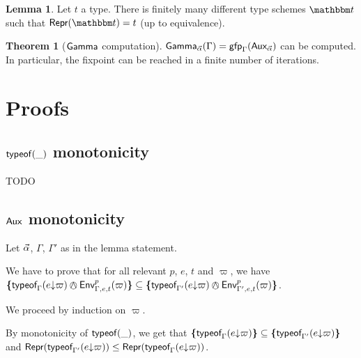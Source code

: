 \documentclass[a4paper]{article}
\theoremstyle{definition}
\newtheorem{theorem}{Theorem}
\newtheorem{lemma}{Lemma}
\begin{document}
        \begin{lemma}
          Let $t$ a type. There is finitely many different type schemes $\ts$ such that $\tsrep \ts = t$ (up to equivalence).
        \end{lemma}

        \begin{theorem}[$\textsf{Gamma}_{}$ computation]
          $\textsf{Gamma}_{\vec \alpha}(\Gamma)=\textsf{gfp}_\Gamma (\textsf{Aux}_{\vec \alpha})$ can be computed.
          In particular, the fixpoint can be reached in a finite number of iterations.
        \end{theorem}

    \section{Proofs}

    \subsection{$\textsf{typeof}_{}(\_)$ monotonicity}
    
    TODO

    \subsection{$\textsf{Aux}_{}$ monotonicity}

      Let $\vec \alpha$, $\Gamma$, $\Gamma'$ as in the lemma statement.

      We have to prove that for all relevant $p$, $e$, $t$ and $\varpi$,
      we have $\tsint {\tyof {\occ e \varpi} {\Gamma} \tsand \Gp p {\Gamma,e,t} (\varpi)} \subseteq \tsint {\tyof {\occ e \varpi} {\Gamma'} \tsand \Gp p {\Gamma',e,t} (\varpi)}$.

      We proceed by induction on $\varpi$. 

      By monotonicity of $\textsf{typeof}_{}(\_)$, we get that
      $\textbf{\textup{\{}}\textsf{typeof}_{\Gamma}(e{\downarrow}\varpi)\textbf{\textup{\}}} \subseteq \textbf{\textup{\{}}\textsf{typeof}_{\Gamma'}(e{\downarrow}\varpi)\textbf{\textup{\}}}$
      and $\textsf{Repr}(\textsf{typeof}_{\Gamma'}(e{\downarrow}\varpi)) \leq \textsf{Repr}(\textsf{typeof}_{\Gamma}(e{\downarrow}\varpi))$.
\end{document}
